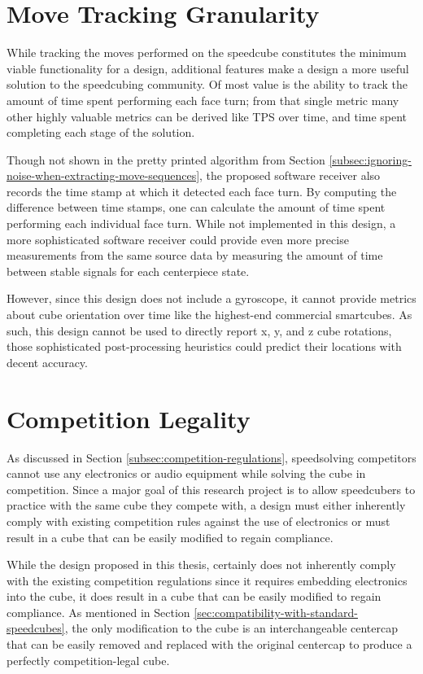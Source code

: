 \section{Move Tracking Granularity}
\label{sec:move-tracking-granularity}

While tracking the moves performed on the speedcube constitutes the
minimum viable functionality for a design, additional features make a
design a more useful solution to the speedcubing community. Of most
value is the ability to track the amount of time spent performing each
face turn; from that single metric many other highly valuable metrics
can be derived like TPS over time, and time spent completing each stage
of the solution.

Though not shown in the pretty printed algorithm from Section
\ref{subsec:ignoring-noise-when-extracting-move-sequences}, the
proposed software receiver also records the time stamp at which it
detected each face turn. By computing the difference between time
stamps, one can calculate the amount of time spent performing each
individual face turn. While not implemented in this design, a more
sophisticated software receiver could provide even more precise
measurements from the same source data by measuring the amount of time
between stable signals for each centerpiece state.

However, since this design does not include a gyroscope, it cannot
provide metrics about cube orientation over time like the highest-end
commercial smartcubes. As such, this design cannot be used to directly
report x, y, and z cube rotations, those sophisticated post-processing
heuristics could predict their locations with decent accuracy.


\section{Competition Legality}
\label{sec:competition-legality}

As discussed in Section \ref{subsec:competition-regulations},
speedsolving competitors cannot use any electronics or audio equipment
while solving the cube in competition. Since a major goal of this
research project is to allow speedcubers to practice with the same cube
they compete with, a design must either inherently comply with existing
competition rules against the use of electronics or must result in a
cube that can be easily modified to regain compliance.

While the design proposed in this thesis, certainly does not inherently
comply with the existing competition regulations since it requires
embedding electronics into the cube, it does result in a cube that can
be easily modified to regain compliance. As mentioned in Section
\ref{sec:compatibility-with-standard-speedcubes}, the only modification
to the cube is an interchangeable centercap that can be easily removed
and replaced with the original centercap to produce a perfectly
competition-legal cube.

